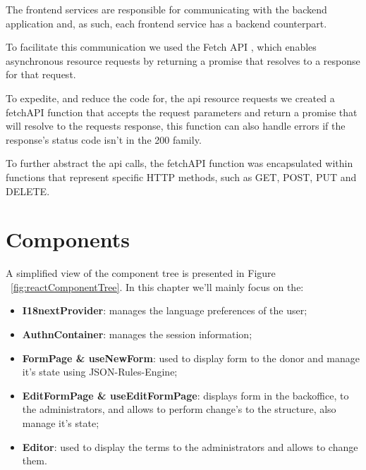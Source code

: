 The frontend services are responsible for communicating with the backend application and, as such, each frontend service has a backend counterpart.

To facilitate this communication we used the Fetch API \cite{Fetch_API}, which enables asynchronous resource requests by returning a promise that resolves to a response for that request.

To expedite, and reduce the code for, the api resource requests we created a fetchAPI function that accepts the request parameters and return a promise that will resolve to the requests response, this function can also handle errors if the response's status code isn't in the 200 family.

To further abstract the api calls,  the fetchAPI function was encapsulated within functions that represent specific HTTP methods, such as GET, POST, PUT and DELETE.

\newpage

\section{Components}

A simplified view of the component tree is presented in Figure ~\ref{fig:reactComponentTree}.
In this chapter we'll mainly focus on the:
\begin{itemize}
	\item \textbf{I18nextProvider}: manages the language preferences of the user;
	\item \textbf{AuthnContainer}: manages the session information;
	\item \textbf{FormPage \& useNewForm}: used to display form to the donor and manage it's state using JSON-Rules-Engine;
	\item \textbf{EditFormPage \& useEditFormPage}:  displays form in the backoffice, to the administrators, and allows to perform change's to the structure, also manage it's state;
	\item \textbf{Editor}: used to display the terms to the administrators and allows to change them. 
\end{itemize}

